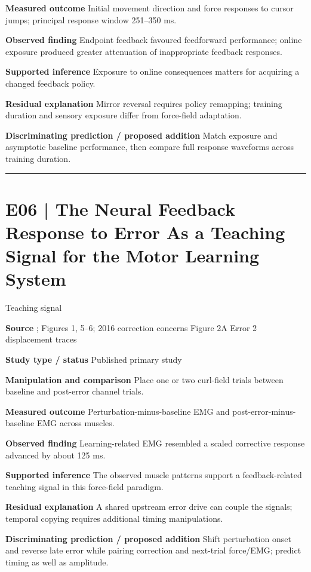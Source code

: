 \documentclass[11pt,a4paper]{article}
\begin{document}
\textbf{Measured outcome} Initial movement direction and force responses to cursor jumps; principal response window 251--350 ms.\par
\textbf{Observed finding} Endpoint feedback favoured feedforward performance; online exposure produced greater attenuation of inappropriate feedback responses.\par
\textbf{Supported inference} Exposure to online consequences matters for acquiring a changed feedback policy.\par
\textbf{Residual explanation} Mirror reversal requires policy remapping; training duration and sensory exposure differ from force-field adaptation.\par
\textbf{Discriminating prediction / proposed addition} Match exposure and asymptotic baseline performance, then compare full response waveforms across training duration.\par
\bigskip\hrule\medskip\section{E06 | The Neural Feedback Response to Error As a Teaching Signal for the Motor Learning System}
{\small\sffamily\color{navy} Teaching signal}\par
\textbf{Source} \cite{albert2016}; Figures 1, 5--6; 2016 correction concerns Figure 2A Error 2 displacement traces\par
\textbf{Study type / status} Published primary study\par
\textbf{Manipulation and comparison} Place one or two curl-field trials between baseline and post-error channel trials.\par
\textbf{Measured outcome} Perturbation-minus-baseline EMG and post-error-minus-baseline EMG across muscles.\par
\textbf{Observed finding} Learning-related EMG resembled a scaled corrective response advanced by about 125 ms.\par
\textbf{Supported inference} The observed muscle patterns support a feedback-related teaching signal in this force-field paradigm.\par
\textbf{Residual explanation} A shared upstream error drive can couple the signals; temporal copying requires additional timing manipulations.\par
\textbf{Discriminating prediction / proposed addition} Shift perturbation onset and reverse late error while pairing correction and next-trial force/EMG; predict timing as well as amplitude.\par
\end{document}

